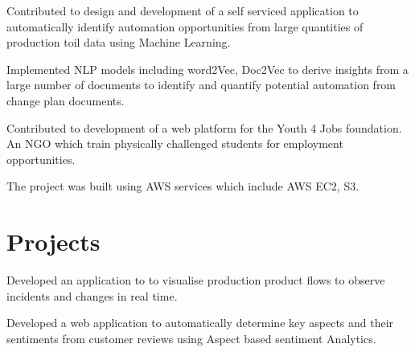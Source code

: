 \documentclass[]{deedy-resume-reversed}
\begin{document}
\begin{minipage}[t]{0.60\textwidth}
\begin{tightemize}
\item Contributed to design and development of a self serviced application to automatically identify automation opportunities from large quantities of production toil data using Machine Learning.
\item Implemented NLP models including word2Vec, Doc2Vec to derive insights from a large number of documents to identify and quantify potential automation from change plan documents.
\end{tightemize}
\sectionsep

\begin{tightemize}
\item Contributed to development of a web platform for the Youth 4 Jobs foundation. An NGO which train physically challenged students for employment opportunities.
\item The project was built using AWS services which include AWS EC2, S3.
\end{tightemize}
\sectionsep


\section{Projects}
\vspace{\topsep} %
\begin{tightemize}
\item Developed an application to to visualise production product flows to observe incidents and changes in real time.
\item Developed a web application to automatically determine key aspects and their sentiments from customer reviews using Aspect based sentiment Analytics.
\end{tightemize}
\sectionsep




\end{minipage}
\end{document}
